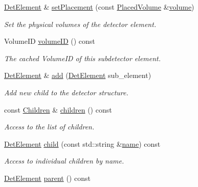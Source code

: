 \begin{DoxyCompactItemize}
\hyperlink{class_d_d4hep_1_1_geometry_1_1_det_element}{Det\+Element} \& \hyperlink{class_d_d4hep_1_1_geometry_1_1_det_element_a18640f84168adced73afd4eb2b84a798}{set\+Placement} (const \hyperlink{class_d_d4hep_1_1_geometry_1_1_placed_volume}{Placed\+Volume} \&\hyperlink{class_d_d4hep_1_1_geometry_1_1_det_element_a14e0d9333e42b32629beb57fee5af167}{volume})
\begin{DoxyCompactList}\small\item\em Set the physical volumes of the detector element. \end{DoxyCompactList}\item 
Volume\+ID \hyperlink{class_d_d4hep_1_1_geometry_1_1_det_element_a022a45351d2af92863c180522759e0ce}{volume\+ID} () const
\begin{DoxyCompactList}\small\item\em The cached Volume\+ID of this subdetector element. \end{DoxyCompactList}\item 
\hyperlink{class_d_d4hep_1_1_geometry_1_1_det_element}{Det\+Element} \& \hyperlink{class_d_d4hep_1_1_geometry_1_1_det_element_a336e54ac88a2f3493f82138699899517}{add} (\hyperlink{class_d_d4hep_1_1_geometry_1_1_det_element}{Det\+Element} sub\+\_\+element)
\begin{DoxyCompactList}\small\item\em Add new child to the detector structure. \end{DoxyCompactList}\item 
const \hyperlink{class_d_d4hep_1_1_geometry_1_1_det_element_afc41f63ac2a467f5077d1cca1292d580}{Children} \& \hyperlink{class_d_d4hep_1_1_geometry_1_1_det_element_ab32f6441336990dc9a44cb4420b01644}{children} () const
\begin{DoxyCompactList}\small\item\em Access to the list of children. \end{DoxyCompactList}\item 
\hyperlink{class_d_d4hep_1_1_geometry_1_1_det_element}{Det\+Element} \hyperlink{class_d_d4hep_1_1_geometry_1_1_det_element_a4ba5423e142412e274ce398afc9009fb}{child} (const std\+::string \&\hyperlink{class_d_d4hep_1_1_handle_a27c7d467a609ab32c133e1f3c7d85ef5}{name}) const
\begin{DoxyCompactList}\small\item\em Access to individual children by name. \end{DoxyCompactList}\item 
\hyperlink{class_d_d4hep_1_1_geometry_1_1_det_element}{Det\+Element} \hyperlink{class_d_d4hep_1_1_geometry_1_1_det_element_ab26ab7d0bd3b8641dbfc34b84d874979}{parent} () const

\end{DoxyCompactItemize}
